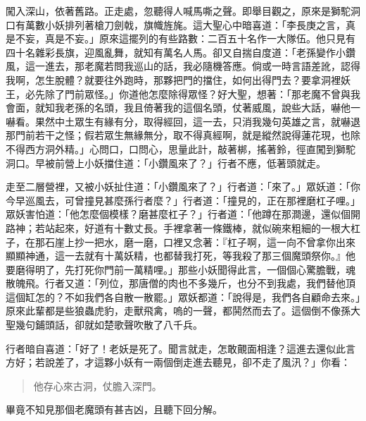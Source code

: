 闖入深山，依著舊路。正走處，忽聽得人喊馬嘶之聲。即舉目觀之，原來是獅駝洞口有萬數小妖排列著槍刀劍戟，旗幟旌旄。這大聖心中暗喜道：「李長庚之言，真是不妄，真是不妄。」原來這擺列的有些路數：二百五十名作一大隊伍。他只見有四十名雜彩長旗，迎風亂舞，就知有萬名人馬。卻又自揣自度道：「老孫變作小鑽風，這一進去，那老魔若問我巡山的話，我必隨機答應。倘或一時言語差訛，認得我啊，怎生脫體？就要往外跑時，那夥把門的擋住，如何出得門去？要拿洞裡妖王，必先除了門前眾怪。」你道他怎麼除得眾怪？好大聖，想著：「那老魔不曾與我會面，就知我老孫的名頭，我且倚著我的這個名頭，仗著威風，說些大話，嚇他一嚇看。果然中土眾生有緣有分，取得經回，這一去，只消我幾句英雄之言，就嚇退那門前若干之怪；假若眾生無緣無分，取不得真經啊，就是縱然說得蓮花現，也除不得西方洞外精。」心問口，口問心，思量此計，敲著梆，搖著鈴，徑直闖到獅駝洞口。早被前營上小妖擋住道：「小鑽風來了？」行者不應，低著頭就走。

走至二層營裡，又被小妖扯住道：「小鑽風來了？」行者道：「來了。」眾妖道：「你今早巡風去，可曾撞見甚麼孫行者麼？」行者道：「撞見的，正在那裡磨杠子哩。」眾妖害怕道：「他怎麼個模樣？磨甚麼杠子？」行者道：「他蹲在那澗邊，還似個開路神；若站起來，好道有十數丈長。手裡拿著一條鐵棒，就似碗來粗細的一根大杠子，在那石崖上抄一把水，磨一磨，口裡又念著：『杠子啊，這一向不曾拿你出來顯顯神通，這一去就有十萬妖精，也都替我打死，等我殺了那三個魔頭祭你。』他要磨得明了，先打死你門前一萬精哩。」那些小妖聞得此言，一個個心驚膽戰，魂散魄飛。行者又道：「列位，那唐僧的肉也不多幾斤，也分不到我處，我們替他頂這個缸怎的？不如我們各自散一散罷。」眾妖都道：「說得是，我們各自顧命去來。」原來此輩都是些狼蟲虎豹，走獸飛禽，嗚的一聲，都鬨然而去了。這個倒不像孫大聖幾句鋪頭話，卻就如楚歌聲吹散了八千兵。

行者暗自喜道：「好了！老妖是死了。聞言就走，怎敢覿面相逢？這進去還似此言方好；若說差了，才這夥小妖有一兩個倒走進去聽見，卻不走了風汛？」你看：
\begin{quote}
他存心來古洞，仗膽入深門。
\end{quote}

畢竟不知見那個老魔頭有甚吉凶，且聽下回分解。
